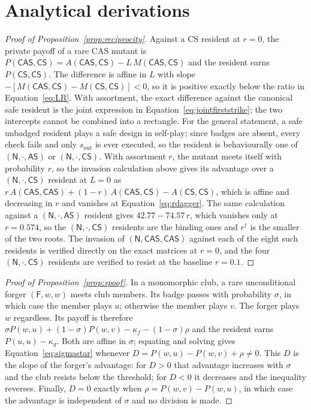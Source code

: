 \documentclass[11pt,a4paper]{article}
\newcommand{\AS}{\textsf{AS}}
\newcommand{\CS}{\textsf{CS}}
\newcommand{\CAS}{\textsf{CAS}}
\begin{document}


\section{Analytical derivations}
\label{app:proofs}

\begin{proof}[Proof of Proposition~\ref{prop:reciprocity}]
Against a \CS{} resident at $r=0$, the private payoff of a rare \CAS{} mutant is
$P(\CAS, \CS) = A(\CAS, \CS) - L\,M(\CAS, \CS)$ and the resident earns
$P(\CS,\CS)$. The difference is affine in $L$ with slope
$-[M(\CAS,\CS) - M(\CS,\CS)] < 0$, so it is positive exactly below the ratio
in Equation~\eqref{eq:LR}. With assortment, the exact difference against the
canonical safe resident is the joint expression in Equation~\eqref{eq:jointfirststrike};
the two intercepts cannot be combined into a rectangle. For the general statement, a safe unbadged resident
plays a safe design in self-play; since badges are absent, every check fails
and only $s_{\mathrm{out}}$ is ever executed, so the resident is behaviourally
one of $(\mathsf{N}, \cdot, \AS)$ or $(\mathsf{N}, \cdot, \CS)$. With
assortment $r$, the mutant meets itself with probability $r$, so the invasion
calculation above gives its advantage over a $(\mathsf{N},\cdot,\CS)$
resident at $L = 0$ as
$r\,A(\CAS,\CAS) + (1-r)\,A(\CAS,\CS) - A(\CS,\CS)$, which is affine and
decreasing in $r$ and vanishes at Equation~\eqref{eq:rdagger}. The same
calculation against a $(\mathsf{N},\cdot,\AS)$ resident gives
$42.77 - 74.57\,r$, which vanishes only at $r = 0.574$, so the
$(\mathsf{N},\cdot,\CS)$ residents are the binding ones and $r^{\dagger}$ is
the smaller of the two roots. The invasion of $(\mathsf{N}, \CAS, \CAS)$ against
each of the eight such residents is verified directly on the exact matrices at
$r = 0$, and the four $(\mathsf{N}, \cdot, \CS)$ residents are verified to
resist at the baseline $r = 0.1$.
\end{proof}

\begin{proof}[Proof of Proposition~\ref{prop:spoof}]
In a monomorphic club, a rare unconditional forger $(\mathsf{F}, w, w)$ meets
club members. Its badge passes with probability $\sigma$, in which case the
member plays $u$; otherwise the member plays $v$. The forger plays $w$
regardless. Its payoff is therefore
$\sigma P(w, u) + (1-\sigma) P(w, v) - \kappa_f - (1-\sigma)\rho$ and the
resident earns $P(u,u) - \kappa_g$. Both are affine in $\sigma$; equating and
solving gives Equation~\eqref{eq:sigmastar} whenever
$D=P(w,u)-P(w,v)+\rho\neq0$. This $D$ is the slope of the forger's advantage:
for $D>0$ that advantage increases with $\sigma$ and the club resists below the
threshold; for $D<0$ it decreases and the inequality reverses. Finally,
$D=0$ exactly when $\rho=P(w,v)-P(w,u)$, in which case the advantage is
independent of $\sigma$ and no division is made.
\end{proof}
\end{document}
